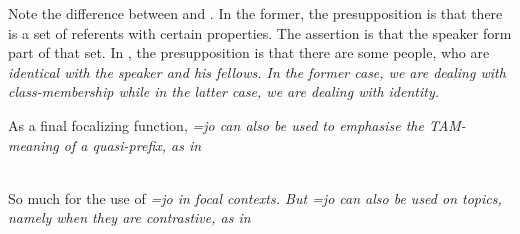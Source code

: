 
Note the difference between  and . In the former, the presupposition is that there is a set of referents with certain properties. The assertion is that the speaker form part of that set. In , the presupposition is that there are some people, who are \em identical \em with the speaker and his fellows. In the former case, we are dealing with class-membership while in the latter case, we are dealing with identity.





 

As a final focalizing function, \em =jo \em can also be used to emphasise the TAM-meaning of a quasi-prefix, as in 

\\ 

So much for the use of \em =jo \em in focal contexts. But \em =jo \em can also be used on topics, namely when they are contrastive, as in 

\\ 

